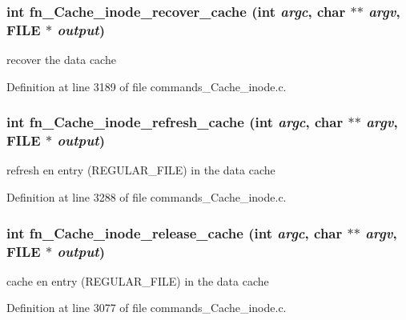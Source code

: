 \subsubsection[{fn\_\-Cache\_\-inode\_\-recover\_\-cache}]{\setlength{\rightskip}{0pt plus 5cm}int fn\_\-Cache\_\-inode\_\-recover\_\-cache (int {\em argc}, \/  char $\ast$$\ast$ {\em argv}, \/  FILE $\ast$ {\em output})}\label{commands__Cache__inode_8c_a88f63b3c17722d4912113b8ecf0b247b}
recover the data cache 

Definition at line 3189 of file commands\_\-Cache\_\-inode.c.
\subsubsection[{fn\_\-Cache\_\-inode\_\-refresh\_\-cache}]{\setlength{\rightskip}{0pt plus 5cm}int fn\_\-Cache\_\-inode\_\-refresh\_\-cache (int {\em argc}, \/  char $\ast$$\ast$ {\em argv}, \/  FILE $\ast$ {\em output})}\label{commands__Cache__inode_8c_a006ca27f7fd03ab4245e4a5b28fe4784}
refresh en entry (REGULAR\_\-FILE) in the data cache 

Definition at line 3288 of file commands\_\-Cache\_\-inode.c.
\subsubsection[{fn\_\-Cache\_\-inode\_\-release\_\-cache}]{\setlength{\rightskip}{0pt plus 5cm}int fn\_\-Cache\_\-inode\_\-release\_\-cache (int {\em argc}, \/  char $\ast$$\ast$ {\em argv}, \/  FILE $\ast$ {\em output})}\label{commands__Cache__inode_8c_a203776f9d299bcef300c35f1be807411}
cache en entry (REGULAR\_\-FILE) in the data cache 

Definition at line 3077 of file commands\_\-Cache\_\-inode.c.
